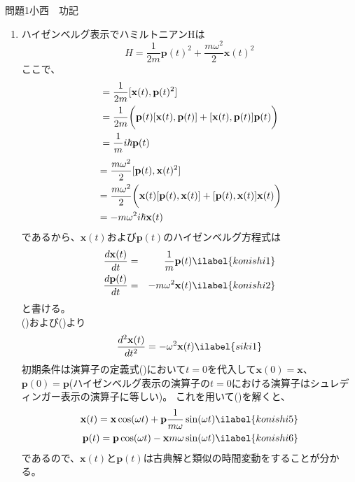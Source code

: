 \documentclass[fleqn]{jbook}
\begin{document}
\begin{answer}{問題1}{小西　功記}
\begin{enumerate}
同様に、時間に依存する位置演算子$\mathbf{ｘ}(t)$は
\begin{eqnarray}
\mathbf{x}(t)=\exp(-\frac{1}{i\hbar}H(t-t_0))\mathbf{x}\exp(\frac{1}{i\hbar}H(t-t_0))\ilabel{konishi3}
\end{eqnarray}
と表されるから、この両辺を微分することによって
\begin{equation}
\frac{d\mathbf{x}(t)}{dt}=\frac{1}{i\hbar}[\mathbf{x}(t),H]
\end{equation}
となる。時間に依存する運動量演算子もこれと同様にして、
\begin{equation}
\frac{d\mathbf{p}(t)}{dt}=\frac{1}{i\hbar}[\mathbf{p}(t),H]
\end{equation}


\item ハイゼンベルグ表示でハミルトニアンHは
\begin{equation}
H=\frac{1}{2m}\mathbf{p}(t)^2+\frac{m\omega^2}{2}\mathbf{x}(t)^2
\end{equation}
ここで、
\begin{align}
[\mathbf{x}(t)^2,H]&=\frac{1}{2m}[\mathbf{x}(t),\mathbf{p}(t)^2] \notag\\
		&=\frac{1}{2m}\biggl (\mathbf{p}(t)[\mathbf{x}(t),\mathbf{p}(t)]+[\mathbf{x}(t),\mathbf{p}(t)]\mathbf{p}(t)\biggr) \notag\\
		&=\frac{1}{m}i\hbar \mathbf{p}(t)
\end{align}
\begin{align}
[\mathbf{p}(t)^2,H]&=\frac{m\omega^2}{2}[\mathbf{p}(t),\mathbf{x}(t)^2] \notag\\
		&=\frac{m\omega^2}{2}\biggl (\mathbf{x}(t)[\mathbf{p}(t),\mathbf{x}(t)]+[\mathbf{p}(t),\mathbf{x}(t)]\mathbf{x}(t)\biggr) \notag\\
		&=-m\omega^2 i\hbar \mathbf{x}(t)
\end{align}
であるから、$\mathbf{x}(t)$および$\mathbf{p}(t)$のハイゼンベルグ方程式は
\begin{eqnarray}
\frac{d\mathbf{x}(t)}{dt}&=&\frac{1}{m}\mathbf{p}(t)\ilabel{konishi1}\\
\frac{d\mathbf{p}(t)}{dt}&=&-m\omega^2\mathbf{x}(t)\ilabel{konishi2}
\end{eqnarray}
と書ける。\\
()および()より
\begin{eqnarray}
\frac{d^2\mathbf{x}(t)}{dt^2}=-\omega^2\mathbf{x}(t)\ilabel{siki1}
\end{eqnarray}
初期条件は演算子の定義式()において$t=0$を代入して$\mathbf{x}(0)=\mathbf{x}$、$\mathbf{p}(0)=\mathbf{p}$(ハイゼンベルグ表示の演算子の$t=0$における演算子はシュレディンガー表示の演算子に等しい)。
これを用いて()を解くと、
\begin{eqnarray}
\mathbf{x}(t)=\mathbf{x}\cos(\omega t)+\mathbf{p}\frac{1}{m\omega}\sin(\omega t)\ilabel{konishi5}\\
\mathbf{p}(t)=\mathbf{p}\cos(\omega t)-\mathbf{x}m\omega\sin(\omega t)\ilabel{konishi6}
\end{eqnarray}
であるので、$\mathbf{x}(t)$と$\mathbf{p}(t)$は古典解と類似の時間変動をすることが分かる。



\end{enumerate}
\end{answer}
\end{document}
